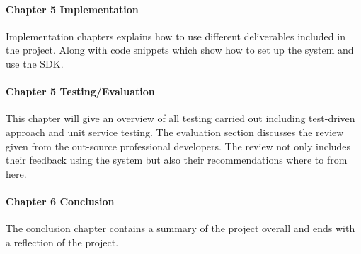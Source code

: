 \paragraph{Chapter 5 Implementation}

Implementation chapters explains how to use different deliverables included in the project. Along with code snippets which show how to set up the system 
and use the SDK.

\paragraph{Chapter 5 Testing/Evaluation}

This chapter will give an overview of all testing carried out including test-driven approach and unit service testing. The evaluation section discusses the review given from the out-source professional developers. The review not only includes their feedback using the system but also their recommendations where to from here. 

\paragraph{Chapter 6 Conclusion}

The conclusion chapter contains a summary of the project overall and ends with a reflection of the project.